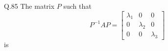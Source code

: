 \documentclass{article}
\begin{document}
																																																																																																																																	  Q.85 \quad The matrix $P$ such that
																																																																																																																																	  \[
																																																																																																																																	  P^{-1} A P = \begin{bmatrix}
																																																																																																																																	  \lambda_1 & 0 & 0 \\
																																																																																																																																	  0 & \lambda_2 & 0 \\
																																																																																																																																	  0 & 0 & \lambda_3
																																																																																																																																	  \end{bmatrix}
																																																																																																																																	  \]
																																																																																																																																	  is
																																																																																																																																	  \newline \vspace{1em}
\end{document}
